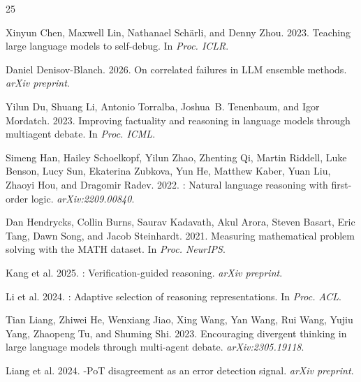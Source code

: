 \documentclass[11pt,a4paper]{article}
\begin{document}
\begin{thebibliography}{25}

Xinyun Chen, Maxwell Lin, Nathanael Sch{\"a}rli, and Denny Zhou. 2023.
\newblock Teaching large language models to self-debug.
\newblock In \emph{Proc. ICLR}.

Daniel Denisov-Blanch. 2026.
\newblock On correlated failures in LLM ensemble methods.
\newblock \emph{arXiv preprint}.

Yilun Du, Shuang Li, Antonio Torralba, Joshua~B. Tenenbaum, and Igor Mordatch. 2023.
\newblock Improving factuality and reasoning in language models through multiagent debate.
\newblock In \emph{Proc. ICML}.

Simeng Han, Hailey Schoelkopf, Yilun Zhao, Zhenting Qi, Martin Riddell, Luke Benson, Lucy Sun, Ekaterina Zubkova, Yun He, Matthew Kaber, Yuan Liu, Zhaoyi Hou, and Dragomir Radev. 2022.
: Natural language reasoning with first-order logic.
\newblock \emph{arXiv:2209.00840}.

Dan Hendrycks, Collin Burns, Saurav Kadavath, Akul Arora, Steven Basart, Eric Tang, Dawn Song, and Jacob Steinhardt. 2021.
\newblock Measuring mathematical problem solving with the {MATH} dataset.
\newblock In \emph{Proc. NeurIPS}.

Kang et al. 2025.
: Verification-guided reasoning.
\newblock \emph{arXiv preprint}.

Li et al. 2024.
: Adaptive selection of reasoning representations.
\newblock In \emph{Proc. ACL}.

Tian Liang, Zhiwei He, Wenxiang Jiao, Xing Wang, Yan Wang, Rui Wang, Yujiu Yang, Zhaopeng Tu, and Shuming Shi. 2023.
\newblock Encouraging divergent thinking in large language models through multi-agent debate.
\newblock \emph{arXiv:2305.19118}.

Liang et al. 2024.
-{PoT} disagreement as an error detection signal.
\newblock \emph{arXiv preprint}.


\end{thebibliography}
\end{document}
